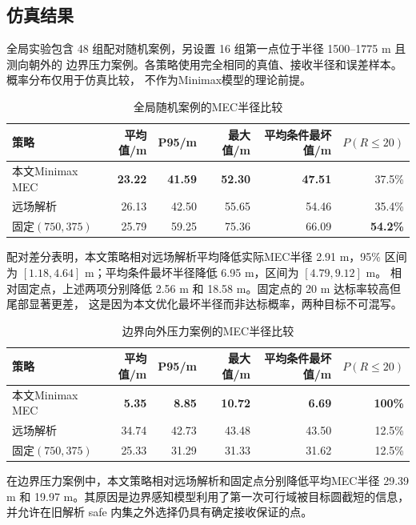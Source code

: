 \subsection{仿真结果}

全局实验包含 48 组配对随机案例，另设置 16 组第一点位于半径 1500--1775 m 且测向朝外的
边界压力案例。各策略使用完全相同的真值、接收半径和误差样本。概率分布仅用于仿真比较，
不作为Minimax模型的理论前提。

\begin{table}[htbp]
\centering
\caption{全局随机案例的MEC半径比较}
\label{tab:q2-global-mec}
\small
\begin{tabular}{lrrrrr}
\toprule
策略 & 平均值/m & P95/m & 最大值/m & 平均条件最坏值/m & $P(R\le20)$\\
\midrule
本文Minimax MEC & \textbf{23.22} & \textbf{41.59} & \textbf{52.30} & \textbf{47.51} & 37.5\%\\
远场解析 & 26.13 & 42.50 & 55.65 & 54.46 & 35.4\%\\
固定$(750,375)$ & 25.79 & 59.25 & 75.36 & 66.09 & \textbf{54.2\%}\\
\bottomrule
\end{tabular}
\end{table}

配对差分表明，本文策略相对远场解析平均降低实际MEC半径 2.91 m，95\% 区间为
$[1.18,4.64]$ m；平均条件最坏半径降低 6.95 m，区间为 $[4.79,9.12]$ m。
相对固定点，上述两项分别降低 2.56 m 和 18.58 m。固定点的 20 m 达标率较高但尾部显著更差，
这是因为本文优化最坏半径而非达标概率，两种目标不可混写。

\begin{table}[htbp]
\centering
\caption{边界向外压力案例的MEC半径比较}
\label{tab:q2-edge-mec}
\small
\begin{tabular}{lrrrrr}
\toprule
策略 & 平均值/m & P95/m & 最大值/m & 平均条件最坏值/m & $P(R\le20)$\\
\midrule
本文Minimax MEC & \textbf{5.35} & \textbf{8.85} & \textbf{10.72} & \textbf{6.69} & \textbf{100\%}\\
远场解析 & 34.74 & 42.73 & 43.48 & 43.50 & 12.5\%\\
固定$(750,375)$ & 25.33 & 31.29 & 31.33 & 31.62 & 12.5\%\\
\bottomrule
\end{tabular}
\end{table}

在边界压力案例中，本文策略相对远场解析和固定点分别降低平均MEC半径 29.39 m 和
19.97 m。其原因是边界感知模型利用了第一次可行域被目标圆截短的信息，并允许在旧解析
safe 内集之外选择仍具有确定接收保证的点。

